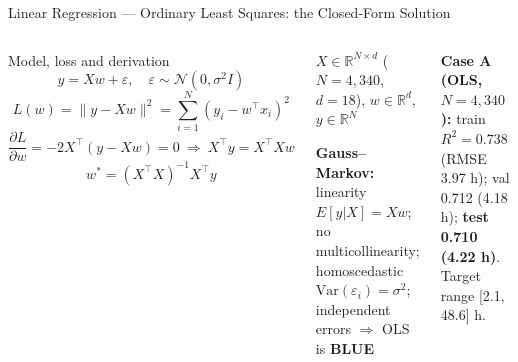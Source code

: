 \documentclass[aspectratio=169,10pt,t]{beamer}
\begin{document}
\begin{frame}{Linear Regression --- Ordinary Least Squares: the Closed-Form Solution}
\begin{columns}[T]
\begin{fbx}{Model, loss and derivation}\[y=Xw+\varepsilon,\quad \varepsilon\sim\mathcal{N}(0,\sigma^{2}I)\]\[L(w)=\|y-Xw\|^{2}=\sum_{i=1}^{N}(y_i-w^{\top}x_i)^{2}\]\[\frac{\partial L}{\partial w}=-2X^{\top}(y-Xw)=0\ \Rightarrow\ X^{\top}y=X^{\top}Xw\]\[\boxed{\,w^{*}=(X^{\top}X)^{-1}X^{\top}y\,}\]\end{fbx}
\begin{tl}\item $X\in\mathbb{R}^{N\times d}$ ($N=4{,}340$, $d=18$), $w\in\mathbb{R}^{d}$, $y\in\mathbb{R}^{N}$\item \textbf{Gauss--Markov:} linearity $E[y|X]=Xw$; no multicollinearity; homoscedastic $\text{Var}(\varepsilon_i)=\sigma^2$; independent errors $\Rightarrow$ OLS is \textbf{BLUE}\end{tl}
\begin{rbox}\scriptsize\textbf{Case A (OLS, $N=4{,}340$):} train $R^2=0.738$ (RMSE 3.97 h); val 0.712 (4.18 h); \textbf{test 0.710 (4.22 h)}. Target range [2.1, 48.6] h.\end{rbox}
\end{columns}
\end{frame}
\end{document}

